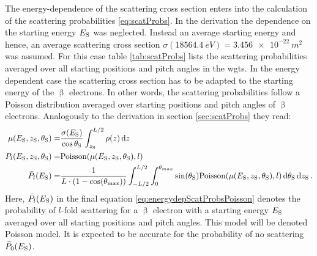 The energy-dependence of the scattering cross section enters into the calculation of the scattering probabilities \eqref{eq:scatProbs}. In the derivation the dependence on the starting energy $E_\mathrm{S}$ was neglected. Instead an average starting energy and hence, an average scattering cross section $\sigma(\SI{18564.4}{eV})=\SI{3.456e-22}{m^2}$ was assumed. For this case table \ref{tab:scatProbs} lists the scattering probabilities averaged over all starting positions and pitch angles in the \gls{wgts}.
In the energy dependent case the scattering cross section has to be adapted to the starting energy of the $\upbeta$ electrons. In other words, the scattering probabilities follow a Poisson distribution averaged over starting positions and pitch angles of $\upbeta$ electrons. Analogously to the derivation in section \ref{sec:scatProbs} they read:
\begin{subequations}
\label{eq:energydepScatProbsPoissonModel}
\begin{align}
    \mu(E_\mathrm{S},z_\mathrm{S},\theta_\mathrm{S}) =&
    \frac{\sigma(E_\mathrm{S})}{\cos\theta_\mathrm{S}}
    \int_{z_\mathrm{S}}^{L/2} \rho(z)\mathop{}\!\mathrm{d} z \label{eq:energydepScatProbsPoissonExpectedScatCount} \\
    P_l(E_\mathrm{S},z_\mathrm{S},\theta_\mathrm{S}) =&
    \mathrm{Poisson}(\mu(E_\mathrm{S},z_\mathrm{S},\theta_\mathrm{S}),l) \label{eq:nonAveragedEnergydepScatProbsPoisson} \\
    \bar{P}_l(E_\mathrm{S}) =&
    \frac{1}{L \cdot (1-\cos(\theta_\mathrm{max}))} 
      \int_{-L/2}^{L/2}  
          \int_{0}^{\theta_{max}} 
            \sin(\theta_\mathrm{S})
            \mathrm{Poisson}(\mu(E_\mathrm{S},z_\mathrm{S},\theta_\mathrm{S}),l)
          \mathop{}\!\mathrm{d}\theta_\mathrm{S}
      \mathop{}\!\mathrm{d}z_\mathrm{S}
      \label{eq:energydepScatProbsPoisson}
    \text{\,.}
\end{align}
\end{subequations}
Here, $\bar{P}_l(E_\mathrm{S})$ in the final equation \eqref{eq:energydepScatProbsPoisson} denotes the probability of $l$-fold scattering for a $\upbeta$ electron with a starting energy $E_\mathrm{S}$ averaged over all starting positions and pitch angles. This model will be denoted Poisson model. It is expected to be accurate for the probability of no scattering $\bar{P}_0(E_\mathrm{S})$.

